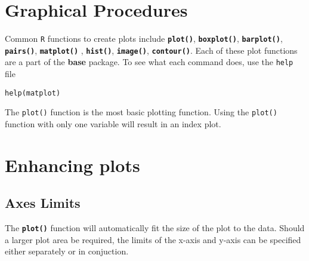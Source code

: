 
\section{Graphical Procedures}

Common \texttt{R} functions to create plots include \texttt{\textbf{plot()}}, \texttt{\textbf{boxplot()}}, \texttt{\textbf{barplot()}}, \texttt{\textbf{pairs()}}, \texttt{\textbf{matplot()}} , \texttt{\textbf{hist()}}, \texttt{\textbf{image()}}, \texttt{\textbf{contour()}}. Each of these plot functions are a part of the \textbf{base} package. To see what each command does, use the \texttt{help} file

\begin{framed}
\begin{verbatim}
help(matplot)
\end{verbatim}
\end{framed}

\noindent The \texttt{plot()} function is the most basic plotting function. Using the \texttt{plot()} function with only one variable will result in an index plot. 


 

\section{Enhancing plots}



\subsection{Axes Limits}
The \textbf{\texttt{plot()}} function will automatically fit the size of the plot to the data. Should a larger plot area be required, the limits of the x-axis and y-axis can be specified either separately or in conjuction. 


